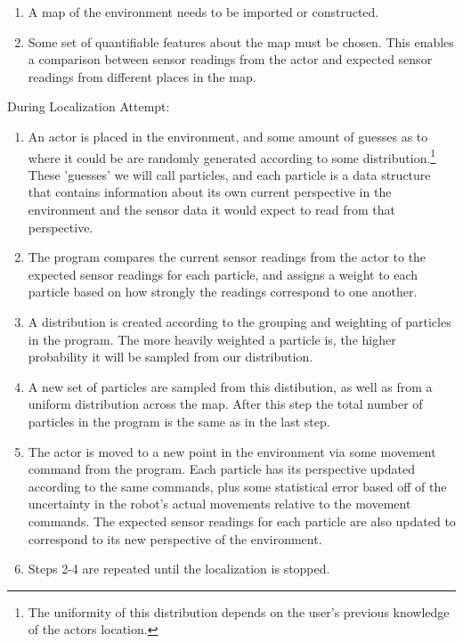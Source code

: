 \documentclass[a4paper,11pt]{article}
\begin{document}
  \begin{enumerate}
  \item A map of the environment needs to be imported or constructed.
  \item Some set of quantifiable features about the map must be chosen. This enables a comparison between sensor readings from the actor and expected sensor readings from different places in the map.
  \end{enumerate}
  
  During Localization Attempt:
  
  \begin{enumerate}
  \item An actor is placed in the environment, and some amount of guesses as to where it could be are randomly generated according to some distribution.\footnote{The uniformity of this distribution depends on the user's previous knowledge of the actors location.} These 'guesses' we will call particles, and each particle is a data structure that contains information about its own current perspective in the environment and the sensor data it would expect to read from that perspective.
  \item The program compares the current sensor readings from the actor to the expected sensor readings for each particle, and assigns a weight to each particle based on how strongly the readings correspond to one another.
  \item A distribution is created according to the grouping and weighting of particles in the program. The more heavily weighted a particle is, the higher probability it will be sampled from our distribution.
  \item A new set of particles are sampled from this distibution, as well as from a uniform distribution across the map. After this step the total number of particles in the program is the same as in the last step.
  \item The actor is moved to a new point in the environment via some movement command from the program. Each particle has its perspective updated according to the same commands, plus some statistical error based off of the uncertainty in the robot's actual movements relative to the movement commands. The expected sensor readings for each particle are also updated to correspond to its new perspective of the environment.
  \item Steps 2-4 are repeated until the localization is stopped. 
  \end{enumerate} 
  
\end{document}
